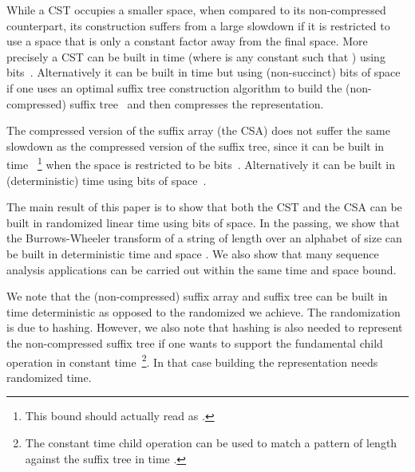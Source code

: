 \documentclass[a4paper]{article}
\begin{document}
While a \textsc{CST} occupies a smaller space, when compared to its non-compressed counterpart, its construction suffers from a large slowdown if it is restricted to use a space that is only a constant factor away from the final space. More precisely a \textsc{CST} can be built in  time (where  is any constant such that ) using  bits~\cite{HSS09}. Alternatively it can be built in  time but using (non-succinct)  bits of space if one uses an optimal suffix tree construction algorithm to build the (non-compressed) suffix tree~\cite{Fa97} and then compresses the representation. 




The compressed version of the suffix array (the \textsc{CSA}) does not suffer the same slowdown as the compressed version of the suffix tree, since it can be built in time ~\footnote{This bound should actually read as . } when the space is restricted to be  bits~\cite{HSS09}. 
Alternatively it can be built in (deterministic) time  using  bits of space~\cite{OS09}.


The main result of this paper is to show that both the \textsc{CST} and the \textsc{CSA} can be built in randomized linear time using  bits of space. In the passing, we show that the Burrows-Wheeler transform of a string of length  over 
an alphabet of size  can be built in deterministic  time and space . We also 
show that many sequence analysis applications can be carried out within the same time and space bound. 



We note that the (non-compressed) suffix array and suffix tree can be built in time deterministic  as opposed to the randomized  we achieve. The randomization is due to hashing. However, we also note that hashing is also needed to represent the non-compressed suffix tree if one wants to support the fundamental child operation in constant time~\footnote{The constant time child operation can be used to match a pattern of length  against the suffix tree in time .}. In that case building the representation needs randomized  time. 

\begin{comment}
Otherwise, if one insists on deterministic linear time, then the child operation (on a non-compressed suffix tree) can only be supported in  time.
If one abandons the requirement that certain operations on the compressed suffix tree be supported in constant time (but supported in  time), then we show that the compressed suffix tree can be built in deterministic  time. 
\end{comment}
\end{document}
